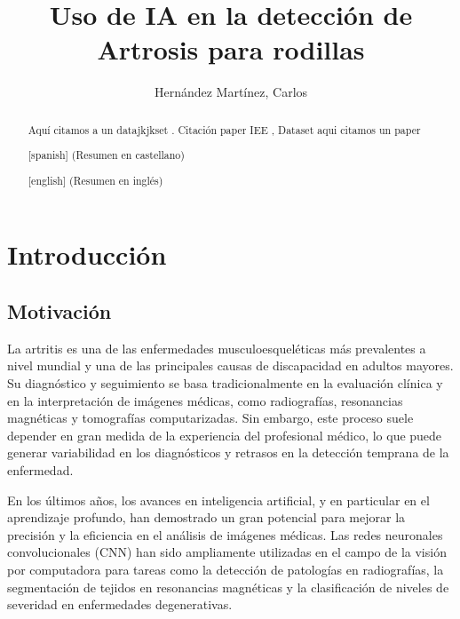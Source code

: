 \documentclass[11pt,spanish,listoffigures,listoftables]{tfgetsinf}
\title{Uso de IA en la detección de Artrosis para rodillas}
\author{Hernández Martínez, Carlos}
\begin{document}

\begin{abstract}
Aquí citamos a un datajkjkset \cite{gornale2020digital}.
Citación paper IEE \cite{10863523}, Dataset \cite{chen2018knee}
aqui citamos un paper \cite{VAATTOVAARA2025100580}
\end{abstract}

\begin{abstract}[spanish]
(Resumen en castellano)
\end{abstract}

\begin{abstract}[english]
(Resumen en inglés)
\end{abstract}

\mainmatter


\chapter{Introducción}  %

\section{Motivación}     %
La artritis es una de las enfermedades musculoesqueléticas más prevalentes a nivel mundial y una de las principales causas de discapacidad en adultos mayores. Su diagnóstico y seguimiento se basa tradicionalmente en la evaluación clínica y en la interpretación de imágenes médicas, como radiografías, resonancias magnéticas y tomografías computarizadas. Sin embargo, este proceso suele depender en gran medida de la experiencia del profesional médico, lo que puede generar variabilidad en los diagnósticos y retrasos en la detección temprana de la enfermedad.

En los últimos años, los avances en inteligencia artificial, y en particular en el aprendizaje profundo, han demostrado un gran potencial para mejorar la precisión y la eficiencia en el análisis de imágenes médicas. Las redes neuronales convolucionales (CNN) han sido ampliamente utilizadas en el campo de la visión por computadora para tareas como la detección de patologías en radiografías, la segmentación de tejidos en resonancias magnéticas y la clasificación de niveles de severidad en enfermedades degenerativas.
\end{document}
